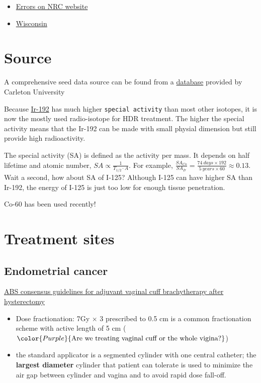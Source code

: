 \documentclass[]{book}
\providecommand{\tightlist}{%
  \setlength{\itemsep}{0pt}\setlength{\parskip}{0pt}}
\theoremstyle{definition}
\theoremstyle{definition}
\theoremstyle{definition}
\theoremstyle{remark}
\begin{document}
\begin{itemize}
\tightlist
\item
  \href{http://www.nrc.gov/reading-rm/doccollections/nuregs/brochures/br0117/}{Errors
  on NRC website}
\item
  \href{(http://chapter.aapm.org/GLC/media/2011/tollenaar.pdf)}{Wisconsin}
\end{itemize}

\section{Source}\label{source}

A comprehensive seed data source can be found from a
\href{http://www.physics.carleton.ca/clrp/seed_database}{database}
provided by Carleton University

Because
\href{https://www.estro.org/about/governance-organisation/committees-activities/tg43-ir-192-hdr}{Ir-192}
has much higher \texttt{special\ activity} than most other isotopes, it
is now the mostly used radio-isotope for HDR treatment. The higher the
special activity means that the Ir-192 can be made with small physial
dimension but still provide high radioactivity.

The special activity (SA) is defined as the activity per mass. It
depends on half lifetime and atomic number,
\(SA \propto \frac{1}{T_{1/2}\cdot A}\). For example,
\(\frac{SA_{Co}}{SA_{Ir}} = \frac{74\ days \times 192}{5\ years \times 60} \approx 0.13\).
Wait a second, how about SA of I-125? Although I-125 can have higher SA
than Ir-192, the energy of I-125 is just too low for enough tissue
penetration.

Co-60 has been used recently!

\section{Treatment sites}\label{treatment-sites-1}

\subsection{Endometrial cancer}\label{endometrial-cancer}

\href{https://www.sciencedirect.com/science/article/pii/S1538472111003874?via\%3Dihub}{ABS
consensus guidelines for adjuvant vaginal cuff brachytherapy after
hysterectomy}

\begin{itemize}
\tightlist
\item
  Dose fractionation: 7Gy \(\times\) 3 prescribed to 0.5 cm is a common
  fractionation scheme with active length of 5 cm
  (\(\color{Purple} {\text{Are we treating vaginal cuff or the whole vigina?}}\))
\item
  the standard applicator is a segmented cylinder with one central
  catheter; the \textbf{largest diameter} cylinder that patient can
  tolerate is used to minimize the air gap between cylinder and vagina
  and to avoid rapid dose fall-off.
\end{itemize}
\end{document}
